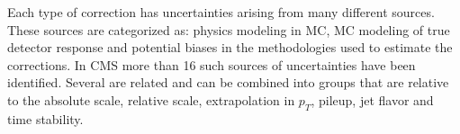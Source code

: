 Each type of correction has uncertainties arising from many different sources.
These sources are categorized as: physics modeling in MC, MC modeling of true detector response and potential biases in the methodologies used to estimate the corrections. In CMS more than 16 such sources of uncertainties have been identified. Several are
related and can be combined into groups that are relative to the absolute scale, relative
scale, extrapolation in $p_T$, pileup, jet flavor and time stability.

